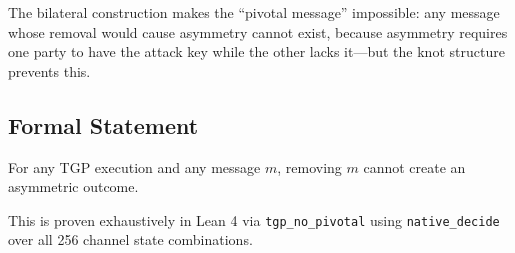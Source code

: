 The bilateral construction makes the ``pivotal message'' impossible: any message whose removal would cause asymmetry cannot exist, because asymmetry requires one party to have the attack key while the other lacks it---but the knot structure prevents this.

\subsection{Formal Statement}

\begin{theorem}
\label{thm:no-pivotal}
For any TGP execution and any message $m$, removing $m$ cannot create an asymmetric outcome.
\end{theorem}

This is proven exhaustively in Lean 4 via \texttt{tgp\_no\_pivotal} using \texttt{native\_decide} over all 256 channel state combinations.
